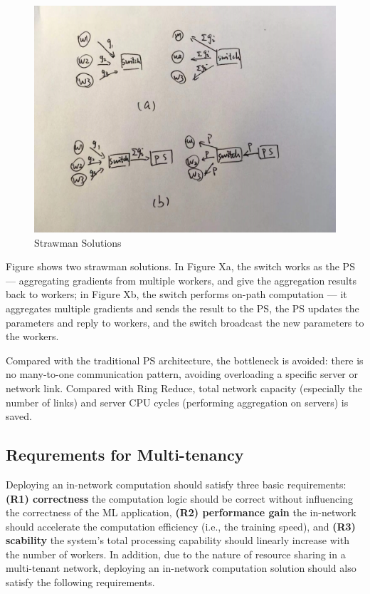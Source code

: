 \begin{figure}[htb]
\centering
\includegraphics[width=0.8\columnwidth]{figures/strawman.jpg}
\caption{Strawman Solutions}
\end{figure}

Figure  shows two strawman solutions. In Figure Xa, the switch works as the PS --- aggregating gradients from multiple workers, and give the aggregation results back to workers; in Figure Xb, the switch performs on-path computation --- it aggregates multiple gradients and sends the result to the PS, the PS updates the parameters and reply to workers, and the switch broadcast the new parameters to the workers.

Compared with the traditional PS architecture, the bottleneck is avoided: there is no many-to-one communication pattern, avoiding overloading a specific server or network link. Compared with Ring Reduce, total network capacity (especially the number of links) and server CPU cycles 
(performing aggregation on servers) is saved.


\subsection{Requrements for Multi-tenancy}
Deploying an in-network computation should satisfy three basic requirements: \textbf{(R1) correctness} the computation logic should be correct without influencing the correctness of the ML application,  \textbf{(R2) performance gain} the in-network should accelerate the computation efficiency (i.e., the training speed), and \textbf{(R3) scability} the system's total processing capability should linearly increase with the number of workers. In addition, due to the nature of resource sharing in a multi-tenant network, deploying an in-network computation solution should also satisfy the following requirements.

